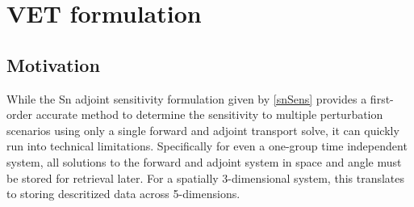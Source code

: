 \documentclass{article}
\begin{document}
\section{VET formulation}
\subsection{Motivation} 
While the Sn adjoint sensitivity formulation given by \ref{snSens} provides a first-order accurate method to determine the sensitivity to multiple perturbation scenarios using only a single forward and adjoint transport solve, it can quickly run into technical limitations. Specifically for even a one-group time independent system, all solutions to the forward and adjoint system in space and angle must be stored for retrieval later. For a spatially 3-dimensional system, this translates to storing descritized data across 5-dimensions.
\end{document}
